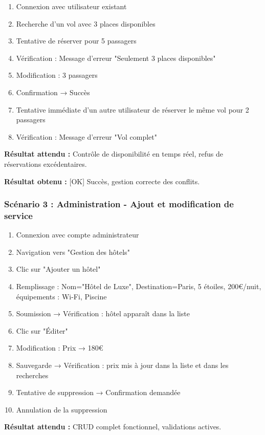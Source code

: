 \documentclass[12pt,a4paper]{report}
\begin{document}
\begin{enumerate}
    \item Connexion avec utilisateur existant
    \item Recherche d'un vol avec 3 places disponibles
    \item Tentative de réserver pour 5 passagers
    \item Vérification : Message d'erreur "Seulement 3 places disponibles"
    \item Modification : 3 passagers
    \item Confirmation → Succès
    \item Tentative immédiate d'un autre utilisateur de réserver le même vol pour 2 passagers
    \item Vérification : Message d'erreur "Vol complet"
\end{enumerate}

\textbf{Résultat attendu :} Contrôle de disponibilité en temps réel, refus de réservations excédentaires.

\textbf{Résultat obtenu :} [OK] Succès, gestion correcte des conflits.

\subsubsection{Scénario 3 : Administration - Ajout et modification de service}

\begin{enumerate}
    \item Connexion avec compte administrateur
    \item Navigation vers "Gestion des hôtels"
    \item Clic sur "Ajouter un hôtel"
    \item Remplissage : Nom="Hôtel de Luxe", Destination=Paris, 5 étoiles, 200€/nuit, équipements : Wi-Fi, Piscine
    \item Soumission → Vérification : hôtel apparaît dans la liste
    \item Clic sur "Éditer"
    \item Modification : Prix → 180€
    \item Sauvegarde → Vérification : prix mis à jour dans la liste et dans les recherches
    \item Tentative de suppression → Confirmation demandée
    \item Annulation de la suppression
\end{enumerate}

\textbf{Résultat attendu :} CRUD complet fonctionnel, validations actives.
\end{document}
